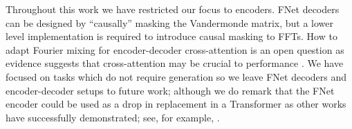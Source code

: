 Throughout this work we have restricted our focus to encoders. FNet decoders can be designed by ``causally'' masking the Vandermonde matrix, but a lower level implementation is required to introduce causal masking to FFTs. How to adapt Fourier mixing for encoder-decoder cross-attention is an open question as evidence suggests that cross-attention may be crucial to performance \citep{you2020hard}. We have focused on tasks which do not require generation so we leave FNet decoders and encoder-decoder setups to future work; although we do remark that the FNet encoder could be used as a drop in replacement in a Transformer as other works have successfully demonstrated; see, for example, \cite{zaheer2020big, guo2021longt5}.
